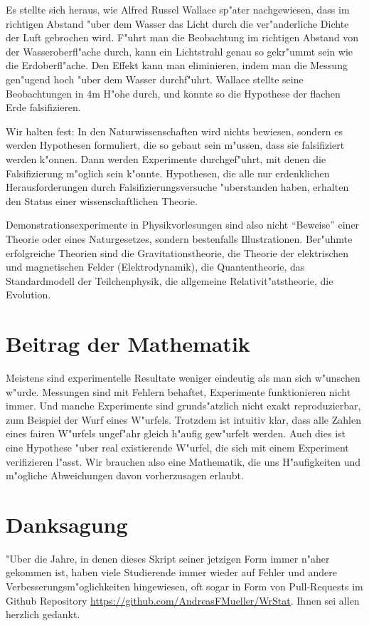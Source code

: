 Es stellte sich heraus, wie Alfred Russel Wallace sp"ater nachgewiesen,
dass im richtigen Abstand "uber dem Wasser das Licht durch die
ver"anderliche Dichte der Luft gebrochen wird.
F"uhrt man die Beobachtung im richtigen Abstand von der Wasseroberfl"ache
durch, kann ein Lichtstrahl genau so gekr"ummt sein wie die Erdoberfl"ache.
Den Effekt kann man eliminieren, indem man die Messung gen"ugend hoch
"uber dem Wasser durchf"uhrt. 
Wallace stellte seine Beobachtungen in 4m H"ohe durch, und konnte
so die Hypothese der flachen Erde falsifizieren.

Wir halten fest: In den Naturwissenschaften wird nichts bewiesen,
sondern es werden Hypothesen formuliert, die so gebaut sein
m"ussen, dass sie falsifiziert werden k"onnen.
Dann werden Experimente durchgef"uhrt, mit denen die Falsifizierung
m"oglich sein k"onnte.
Hypothesen, die alle nur erdenklichen Herausforderungen durch
Falsifizierungsversuche "uberstanden haben, erhalten den Status
einer wissenschaftlichen Theorie.

Demonstrationsexperimente in Physikvorlesungen sind also nicht
``Beweise'' einer Theorie oder eines Naturgesetzes, sondern bestenfalls
Illustrationen.
Ber"uhmte erfolgreiche Theorien sind die Gravitationstheorie, die
Theorie der elektrischen und magnetischen Felder (Elektrodynamik),
die Quantentheorie, das Standardmodell der Teilchenphysik, die
allgemeine Relativit"atstheorie, die Evolution.

\section*{Beitrag der Mathematik}
Meistens sind experimentelle Resultate weniger eindeutig als man sich
w"unschen w"urde.
Messungen sind mit Fehlern behaftet, Experimente funktionieren nicht
immer.
Und manche Experimente sind grunds"atzlich nicht exakt reproduzierbar,
zum Beispiel der Wurf eines W"urfels.
Trotzdem ist intuitiv klar, dass alle Zahlen eines fairen W"urfels
ungef"ahr gleich h"aufig gew"urfelt werden.
Auch dies ist eine Hypothese "uber real existierende W"urfel, die
sich mit einem Experiment verifizieren l"asst.
Wir brauchen also eine Mathematik, die uns H"aufigkeiten und m"ogliche
Abweichungen davon vorherzusagen erlaubt.

\section*{Danksagung}
"Uber die Jahre, in denen dieses Skript seiner jetzigen Form immer n"aher
gekommen ist, haben viele Studierende immer wieder auf Fehler und andere
Verbesserungsm"oglichkeiten hingewiesen, oft sogar in Form von Pull-Requests
im Github Repository \url{https://github.com/AndreasFMueller/WrStat}.
Ihnen sei allen herzlich gedankt.

